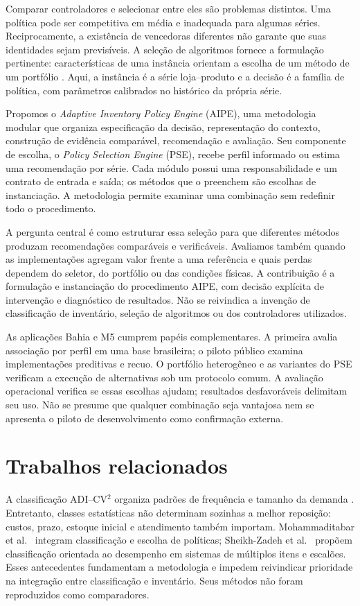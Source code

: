 \documentclass[preprint,12pt]{elsarticle}
\begin{document}
Comparar controladores e selecionar entre eles são problemas distintos. Uma política pode ser competitiva em média e inadequada para algumas séries. Reciprocamente, a existência de vencedoras diferentes não garante que suas identidades sejam previsíveis. A seleção de algoritmos fornece a formulação pertinente: características de uma instância orientam a escolha de um método de um portfólio \cite{rice1976,Kotthoff2014AlgorithmSelection}. Aqui, a instância é a série loja--produto e a decisão é a família de política, com parâmetros calibrados no histórico da própria série.

Propomos o \textit{Adaptive Inventory Policy Engine} (AIPE), uma metodologia modular que organiza especificação da decisão, representação do contexto, construção de evidência comparável, recomendação e avaliação. Seu componente de escolha, o \textit{Policy Selection Engine} (PSE), recebe perfil informado ou estima uma recomendação por série. Cada módulo possui uma responsabilidade e um contrato de entrada e saída; os métodos que o preenchem são escolhas de instanciação. A metodologia permite examinar uma combinação sem redefinir todo o procedimento.

A pergunta central é como estruturar essa seleção para que diferentes métodos produzam recomendações comparáveis e verificáveis. Avaliamos também quando as implementações agregam valor frente a uma referência e quais perdas dependem do seletor, do portfólio ou das condições físicas. A contribuição é a formulação e instanciação do procedimento AIPE, com decisão explícita de intervenção e diagnóstico de resultados. Não se reivindica a invenção de classificação de inventário, seleção de algoritmos ou dos controladores utilizados.

As aplicações Bahia e M5 cumprem papéis complementares. A primeira avalia associação por perfil em uma base brasileira; o piloto público examina implementações preditivas e recuo. O portfólio heterogêneo e as variantes do PSE verificam a execução de alternativas sob um protocolo comum. A avaliação operacional verifica se essas escolhas ajudam; resultados desfavoráveis delimitam seu uso. Não se presume que qualquer combinação seja vantajosa nem se apresenta o piloto de desenvolvimento como confirmação externa.

\section{Trabalhos relacionados}
A classificação ADI--CV$^2$ organiza padrões de frequência e tamanho da demanda \cite{syntetos2005}. Entretanto, classes estatísticas não determinam sozinhas a melhor reposição: custos, prazo, estoque inicial e atendimento também importam. Mohammaditabar et al.\ \cite{Mohammaditabar2012Integrated} integram classificação e escolha de políticas; Sheikh-Zadeh et al.\ \cite{SheikhZadeh2021PBIC} propõem classificação orientada ao desempenho em sistemas de múltiplos itens e escalões. Esses antecedentes fundamentam a metodologia e impedem reivindicar prioridade na integração entre classificação e inventário. Seus métodos não foram reproduzidos como comparadores.
\end{document}
